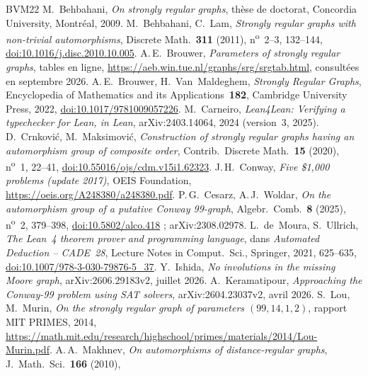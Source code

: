 \documentclass[11pt,a4paper]{article}
\theoremstyle{remark}
\begin{document}
{\small\raggedright
\begin{thebibliography}{BVM22}
 M.~Behbahani, \emph{On strongly regular graphs}, thèse de doctorat, Concordia University, Montréal, 2009.
 M.~Behbahani, C.~Lam, \emph{Strongly regular graphs with non-trivial automorphisms}, Discrete Math.\
\textbf{311} (2011), n\textsuperscript{o}~2--3, 132--144,
\href{https://doi.org/10.1016/j.disc.2010.10.005}{doi:10.1016/j.disc.2010.10.005}.
\bibitem[Br]{Br} A.\,E.~Brouwer, \emph{Parameters of strongly regular graphs}, tables en ligne,
\url{https://aeb.win.tue.nl/graphs/srg/srgtab.html}, consultées en septembre 2026.
\bibitem[BVM22]{BVM22} A.\,E.~Brouwer, H.~Van~Maldeghem, \emph{Strongly Regular Graphs}, Encyclopedia of Mathematics and its
Applications~\textbf{182}, Cambridge University Press, 2022,
\href{https://doi.org/10.1017/9781009057226}{doi:10.1017/9781009057226}.
\bibitem[Car24]{Car24} M.~Carneiro, \emph{Lean4Lean: Verifying a typechecker for Lean, in Lean}, arXiv:2403.14064, 2024
(version~3, 2025).
 D.~Crnković, M.~Maksimović, \emph{Construction of strongly regular graphs having an automorphism group of
composite order}, Contrib.\ Discrete Math.\ \textbf{15} (2020), n\textsuperscript{o}~1, 22--41,
\href{https://doi.org/10.55016/ojs/cdm.v15i1.62323}{doi:10.55016/ojs/cdm.v15i1.62323}.
\bibitem[Co]{Co} J.\,H.~Conway, \emph{Five \$1,000 problems (update 2017)}, OEIS Foundation,
\url{https://oeis.org/A248380/a248380.pdf}.
 P.\,G.~Cesarz, A.\,J.~Woldar, \emph{On the automorphism group of a putative Conway 99-graph}, Algebr.\
Comb.\ \textbf{8} (2025), n\textsuperscript{o}~2, 379--398, \href{https://doi.org/10.5802/alco.418}{doi:10.5802/alco.418} ;
arXiv:2308.02978.
\bibitem[dMU21]{dMU21} L.~de~Moura, S.~Ullrich, \emph{The Lean~4 theorem prover and programming language}, dans
\emph{Automated Deduction -- CADE~28}, Lecture Notes in Comput.\ Sci., Springer, 2021, 625--635,
\href{https://doi.org/10.1007/978-3-030-79876-5_37}{doi:10.1007/978-3-030-79876-5\_37}.
\bibitem[I26]{I26} Y.~Ishida, \emph{No involutions in the missing Moore graph}, arXiv:2606.29183v2, juillet 2026.
\bibitem[K26]{K26} A.~Keramatipour, \emph{Approaching the Conway-99 problem using SAT solvers}, arXiv:2604.23037v2, avril 2026.
\bibitem[LM14]{LM14} S.~Lou, M.~Murin, \emph{On the strongly regular graph of parameters $(99,14,1,2)$}, rapport MIT PRIMES,
2014, \url{https://math.mit.edu/research/highschool/primes/materials/2014/Lou-Murin.pdf}.
\bibitem[Mak10]{Mak10} A.\,A.~Makhnev, \emph{On automorphisms of distance-regular graphs}, J.\ Math.\ Sci.\ \textbf{166} (2010),

\end{thebibliography}}
\end{document}
